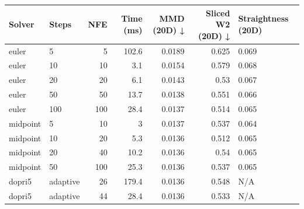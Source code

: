 \begin{tabular}{llrrrrl}
\toprule
Solver & Steps & NFE & Time (ms) & MMD (20D) ↓ & Sliced W2 (20D) ↓ & Straightness (20D) \\
\midrule
euler & 5 & 5 & 102.6 & 0.0189 & 0.625 & 0.069 \\
euler & 10 & 10 & 3.1 & 0.0154 & 0.579 & 0.068 \\
euler & 20 & 20 & 6.1 & 0.0143 & 0.53 & 0.067 \\
euler & 50 & 50 & 13.7 & 0.0138 & 0.551 & 0.066 \\
euler & 100 & 100 & 28.4 & 0.0137 & 0.514 & 0.065 \\
midpoint & 5 & 10 & 3 & 0.0137 & 0.537 & 0.064 \\
midpoint & 10 & 20 & 5.3 & 0.0136 & 0.512 & 0.065 \\
midpoint & 20 & 40 & 10.2 & 0.0136 & 0.54 & 0.065 \\
midpoint & 50 & 100 & 25.3 & 0.0136 & 0.537 & 0.065 \\
dopri5 & adaptive & 26 & 179.4 & 0.0136 & 0.548 & N/A \\
dopri5 & adaptive & 44 & 28.4 & 0.0136 & 0.533 & N/A \\
\bottomrule
\end{tabular}
